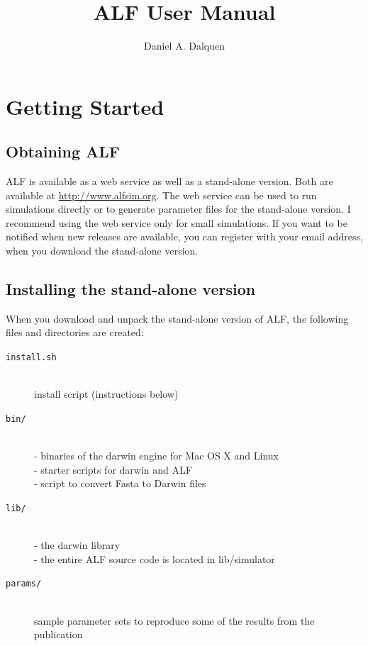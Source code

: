 \documentclass[11pt]{article}
\begin{document}
%
\nobibliography*

\title{ALF User Manual}
\author{Daniel A. Dalquen}
\maketitle

\section{Getting Started}
\subsection{Obtaining ALF}
ALF is available as a web service as well as a stand-alone version. Both are available at \url{http://www.alfsim.org}. The web service can be used to run simulations directly or to generate parameter files for the stand-alone version. I recommend using the web service only for small simulations. If you want to be notified when new releases are available, you can register with your email address, when you download the stand-alone version.

\subsection{Installing the stand-alone version}
When you download and unpack the stand-alone version of ALF, the following
files and directories are created:

\begin{description}
\item[\texttt{install.sh}] \hfill \\
install script (instructions below)
\item[\texttt{bin/}] \hfill \\
       - binaries of the darwin engine for Mac OS X and Linux\hfill \\
	   - starter scripts for darwin and ALF \hfill \\
	   - script to convert Fasta to Darwin files
\item[\texttt{lib/}] \hfill \\
       - the darwin library\hfill \\
	   - the entire ALF source code is located in lib/simulator
\item[\texttt{params/}] \hfill \\
sample parameter sets to reproduce some of the results from the publication
\end{description}
\end{document}
